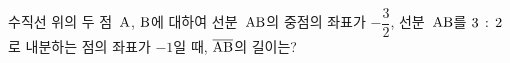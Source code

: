 수직선 위의 두 점~$\mathrm{A}$, $\mathrm{B}$에 대하여 선분~$\mathrm{AB}$의 중점의 좌표가 $-\dfrac{3}{2}$, 선분~$\mathrm{AB}$를 $3\mkern3mu :\mkern3mu 2$로 내분하는 점의 좌표가 $-1$일 때, $\overline{\mathrm{AB}}$의 길이는?
